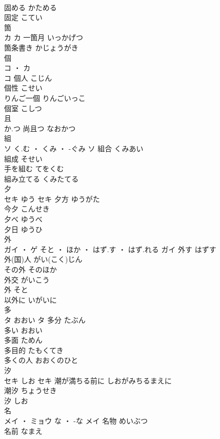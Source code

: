\documentclass[8pt]{extreport}
\begin{document}
\begin{CJK}{UTF8}{min}
\\	固める	かためる	
\\	固定	こてい	
\\	箇	
\\	カ		カ	一箇月	いっかげつ	
\\	箇条書き	かじょうがき	
\\	個	
\\	コ ・ カ
\\	コ	個人	こじん	
\\	個性	こせい	
\\	りんご一個	りんごいっこ	
\\	個室	こしつ	
\\	且	
\\	か.つ														尚且つ	なおかつ	
\\	組	
\\	ソ	く.む ・ くみ ・ -ぐみ	ソ	組合	くみあい	
\\	組成	そせい	
\\	手を組む	てをくむ	
\\	組み立てる	くみたてる	
\\	夕	
\\	セキ	ゆう	セキ	夕方	ゆうがた	
\\	今夕	こんせき	
\\	夕べ	ゆうべ	
\\	夕日	ゆうひ	
\\	外	
\\	ガイ ・ ゲ	そと ・ ほか ・ はず.す ・ はず.れる	ガイ	外す	はずす	
\\	外(国)人	がい(こく)じん	
\\	その外	そのほか	
\\	外交	がいこう	
\\	外	そと	
\\	以外に	いがいに	
\\	多	
\\	タ	おおい	タ	多分	たぶん	
\\	多い	おおい	
\\	多面	ためん	
\\	多目的	たもくてき	
\\	多くの人	おおくのひと	
\\	汐	
\\	セキ	しお	セキ	潮が満ちる前に	しおがみちるまえに	
\\	潮汐	ちょうせき	
\\	汐	しお	
\\	名	
\\	メイ ・ ミョウ	な ・ -な	メイ	名物	めいぶつ	
\\	名前	なまえ	

\end{CJK}
\end{document}

